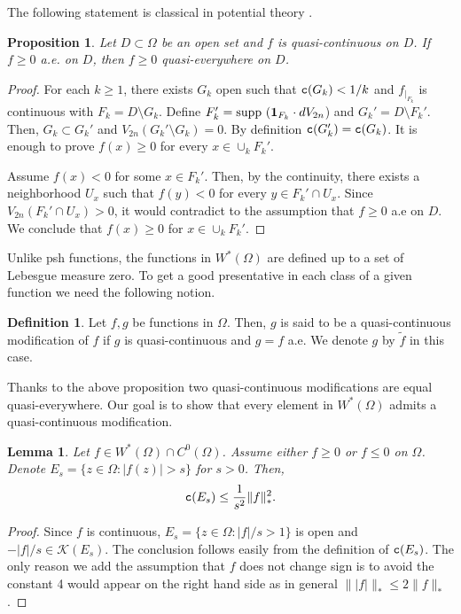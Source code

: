 \documentclass{amsart}
\newcommand{\wt}[1]{\widetilde{#1}}
\newcommand{\tc}{{\tt c}}
\newcommand{\Om}{\Omega}
\newcommand{\supp}{\mbox{supp }}
\newcommand{\cali}[1]{\mathscr{#1}}
\newcommand{\Kc}{\cali{K}}
\newtheorem{prop}[thm]{Proposition}
\newtheorem{lem}[thm]{Lemma}
\theoremstyle{definition}
\newtheorem{defn}[thm]{Definition}
\numberwithin{thm}{section}
\numberwithin{equation}{section}
\renewcommand{\[}{\begin{equation}}
\renewcommand{\]}{\end{equation}}
\begin{document}
The following statement is classical in potential theory \cite[Lemma~2.14]{FOT94}. 
\begin{prop} \label{prop:ae-qe}  Let $D\subset \Om$ be an open set and $f$ is quasi-continuous on $D$. If $f\geq 0$ a.e. on $D$, then $f\geq 0$ quasi-everywhere on $D$.
\end{prop}

\begin{proof} For each $k\geq 1$, there exists $G_k$ open such that $\tc (G_k) <1/k$ and $f_{|_{F_k}}$ is continuous with $F_k = D\setminus G_k$. Define $F_k' = \supp ({\bf 1}_{F_k} \cdot dV_{2n}$) and $G_k' = D\setminus F_k'$. Then, $G_k\subset G_k'$ and $V_{2n} (G_k' \setminus G_k) =0$. By definition  $\tc (G_k') = \tc (G_k)$. It is enough to prove $f(x)\geq 0$ for every $x\in \cup_k F_k'$.

Assume $f(x)<0$ for some $x\in F_k'$. Then, by the continuity, there exists a neighborhood $U_x$ such that $f(y)<0$ for every $y\in F_k' \cap U_x$. Since $V_{2n} (F_k' \cap U_x)>0$,  it would contradict to the assumption that $f\geq 0$ a.e on $D$. We conclude that $f(x) \geq 0$ for $x\in \cup_k F_k'$.
\end{proof}

Unlike psh functions, the functions in $W^*(\Om)$ are defined up to a set of Lebesgue measure zero. To get a good presentative in each class of a given function we need the following notion.

\begin{defn}
Let $f,g$ be functions in $\Om$. Then,  $g$ is said to be a quasi-continuous modification of $f$ if $g$ is quasi-continuous and $g= f$ a.e. We denote $g$ by $\wt f$ in this case.
\end{defn}

Thanks to the above proposition two quasi-continuous modifications are equal quasi-everywhere. 
Our goal is to show that every element in $W^*(\Om)$ admits a quasi-continuous modification.

\begin{lem}\label{lem:cap-sublevel-set} Let $f\in W^*(\Om) \cap C^0(\Om)$.  Assume either $f\geq 0$ or $f\leq 0$ on $\Om$. Denote $E_s = \{z\in \Om: |f(z)| > s\}$ for $s > 0$. Then,
\[\label{eq:c-sublevel-set-est}
	\tc (E_s) \leq \frac{1}{s^2} \|f\|_*^2.
\]
\end{lem}

\begin{proof} Since $f$ is continuous, $E_s = \{z\in \Om : |f|/s>1\}$ is open and $-|f|/s \in \Kc(E_s)$. The conclusion follows easily from the definition of $\tc (E_s)$. The only reason we add the assumption that $f$ does not change sign is  to avoid the constant 4 would appear on the right hand side as in general $\| |f| \|_* \leq 2 \|f\|_*$.
\end{proof}
\end{document}
